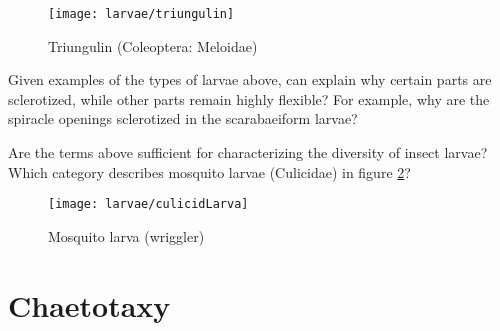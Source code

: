 \begin{figure}[ht!]
  \centering
    \texttt{[image: larvae/triungulin]}
  \caption{Triungulin (Coleoptera: Meloidae) \citep[redrawn from][Fig. 230c]{bhlitem34045maggot}}
  \label{fig:vermiform1}
\end{figure}

\begin{theo}
{}Given examples of the types of larvae above, can explain why certain parts are sclerotized, while other parts remain highly flexible? For example, why are the spiracle openings sclerotized in the scarabaeiform larvae?\vspace{3mm}

\noindent{}Are the terms above sufficient for characterizing the diversity of insect larvae? Which category describes mosquito larvae (Culicidae) in figure \ref{fig:culicidLarva}?
\end{theo}

\begin{figure}[ht!]
  \centering
    \texttt{[image: larvae/culicidLarva]}
  \caption{Mosquito larva (wriggler) \citep[redrawn from][Plate III]{bhlitem49255}}
  \label{fig:culicidLarva}
\end{figure}

\section{Chaetotaxy}

